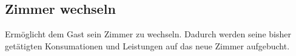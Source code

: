 \documentclass[../SubfileFeatures.tex]{subfiles}
\begin{document}
    \subsection{Zimmer wechseln}
	Ermöglicht dem Gast sein Zimmer zu wechseln. Dadurch werden seine bisher getätigten Konsumationen und Leistungen auf das neue Zimmer aufgebucht.
\end{document}
